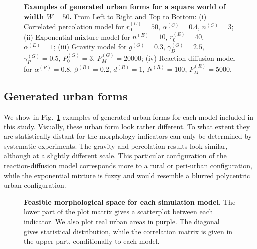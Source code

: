 \documentclass[10pt,letterpaper]{article}
\begin{document}




\begin{figure}[!h]
	\vspace{2cm}
	\caption{{\bf Examples of generated urban forms for a square world of width $W = 50$.} From Left to Right and Top to Bottom: (i) Correlated percolation model for $r_0^{(C)} = 50$, $\alpha^{(C)} = 0.4$, $n^{(C)} = 3$; (ii) Exponential mixture model for $n^{(E)} = 10$, $r_0^{(E)} = 40$, $\alpha^{(E)} = 1$; (iii) Gravity model for $g^{(G)} = 0.3$, $\gamma_D^{(G)} = 2.5$, $\gamma_P^{(G)} = 0.5$, $P_0^{(G)} = 3$, $P_M^{(G)} = 20000$; (iv) Reaction-diffusion model for $\alpha^{(R)} = 0.8$, $\beta^{(R)} = 0.2$, $d^{(R)} = 1$, $N^{(R)} = 100$, $P_M^{(R)} = 5000$.\label{fig:fig3}}
\end{figure}


\subsection*{Generated urban forms}



We show in Fig.~\ref{fig:fig3} examples of generated urban forms for each model included in this study. Visually, these urban form look rather different. To what extent they are statistically distant for the morphology indicators can only be determined by systematic experiments. The gravity and percolation results look similar, although at a slightly different scale. This particular configuration of the reaction-diffusion model corresponds more to a rural or peri-urban configuration, while the exponential mixture is fuzzy and would resemble a blurred polycentric urban configuration.



\begin{figure}[!h]
	\vspace{2cm}
	\caption{{\bf Feasible morphological space for each simulation model.} The lower part of the plot matrix gives a scatterplot between each indicator. We also plot real urban areas in purple. The diagonal gives statistical distribution, while the correlation matrix is given in the upper part, conditionally to each model.\label{fig:fig4}}
\end{figure}
\end{document}
